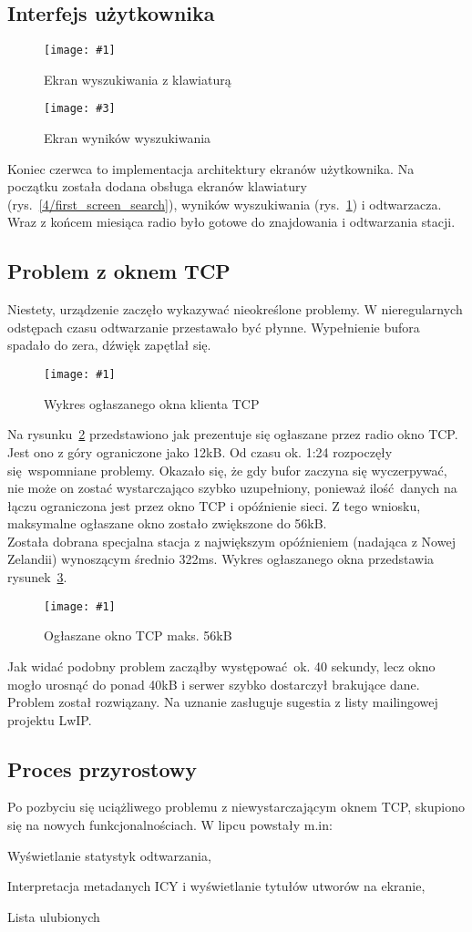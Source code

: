 \documentclass[12pt]{report}
\let\tempone\itemize
\let\temptwo\enditemize
\renewenvironment{itemize}{\tempone\setlength{\itemsep}{0cm}}{\temptwo}
\newcommand{\imgint}[4]{
	\begin{figure}[{#4}]
		\centering
		\texttt{[image: \#1]}
		\caption{#2}
		\label{#1}
	\end{figure}
}
\newcommand{\imgh}[3]{\imgint{#1}{#2}{#3}{H}}
\newcommand{\imgintss}[5]{
	\begin{figure}[{#5}]
		\centering
		\begin{minipage}{.45\textwidth}
			\centering
			\texttt{[image: \#1]}
			\caption{#2}
			\label{#1}
		\end{minipage}%
		\hfill
		\begin{minipage}{.45\textwidth}
			\centering
			\texttt{[image: \#3]}
			\caption{#4}
			\label{#3}
		\end{minipage}
	\end{figure}
}
\newcommand{\imghss}[4]{\imgintss{#1}{#2}{#3}{#4}{H}}
\begin{document}
		\subsection{Interfejs użytkownika}
			\imghss{4/first_screen_search}{Ekran wyszukiwania z klawiaturą}{4/first_screen_res}{Ekran wyników wyszukiwania}
		
			Koniec czerwca to implementacja architektury ekranów użytkownika. Na początku została dodana obsługa ekranów klawiatury (rys.~\ref{4/first_screen_search}), wyników wyszukiwania (rys.~\ref{4/first_screen_res}) i odtwarzacza. Wraz z końcem miesiąca radio było gotowe do znajdowania i odtwarzania stacji.
			
		\subsection{Problem z oknem TCP}
			Niestety, urządzenie zaczęło wykazywać nieokreślone problemy. W nieregularnych odstępach czasu odtwarzanie przestawało być płynne. Wypełnienie bufora spadało do zera, dźwięk zapętlał się.
			
			\imgh{4/tcp_fail}{Wykres ogłaszanego okna klienta TCP}{0.85}
			
			Na rysunku~\ref{4/tcp_fail} przedstawiono jak prezentuje się ogłaszane przez radio okno TCP. Jest ono z góry ograniczone jako 12kB. Od czasu ok. 1:24 rozpoczęły się wspomniane problemy. Okazało się, że gdy bufor zaczyna się wyczerpywać, nie może on zostać wystarczająco szybko uzupełniony, ponieważ ilość danych na łączu ograniczona jest przez okno TCP i opóźnienie sieci. Z tego wniosku, maksymalne ogłaszane okno zostało zwiększone do 56kB.
			$ $\\
			
			Została dobrana specjalna stacja z największym opóźnieniem (nadająca z Nowej Zelandii) wynoszącym średnio 322ms. Wykres ogłaszanego okna przedstawia rysunek~\ref{4/tcp_good}.
			
			\imgh{4/tcp_good}{Ogłaszane okno TCP maks. 56kB}{0.6}

			Jak widać podobny problem zacząłby występować ok. 40 sekundy, lecz okno mogło urosnąć do ponad 40kB i serwer szybko dostarczył brakujące dane. Problem został rozwiązany. Na uznanie zasługuje sugestia z listy mailingowej projektu LwIP. %
			
		\subsection{Proces przyrostowy}
			Po pozbyciu się uciążliwego problemu z niewystarczającym oknem TCP, skupiono się na nowych funkcjonalnościach. W lipcu powstały m.in:
			\begin{itemize}
				\item Wyświetlanie statystyk odtwarzania,
				\item Interpretacja metadanych ICY i wyświetlanie tytułów utworów na ekranie,
				\item Lista ulubionych
			\end{itemize}
			
\end{document}
